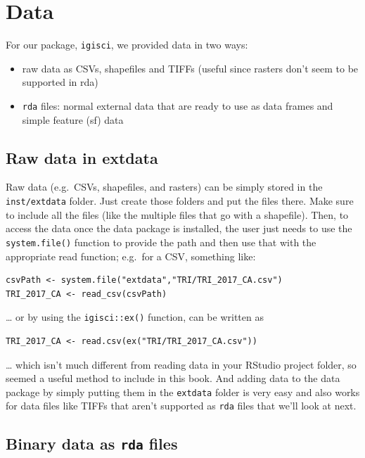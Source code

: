 \documentclass[
]{book}
\providecommand{\tightlist}{%
  \setlength{\itemsep}{0pt}\setlength{\parskip}{0pt}}
\begin{document}
\hypertarget{data-1}{%
\section{Data}\label{data-1}}

For our package, \texttt{igisci}, we provided data in two ways:

\begin{itemize}
\tightlist
\item
  raw data as CSVs, shapefiles and TIFFs (useful since rasters don't seem to be supported in rda)
\item
  \texttt{rda} files: normal external data that are ready to use as data frames and simple feature (sf) data
\end{itemize}

\hypertarget{raw-data-in-extdata}{%
\subsection{Raw data in extdata}\label{raw-data-in-extdata}}

Raw data (e.g.~CSVs, shapefiles, and rasters) can be simply stored in the \texttt{inst/extdata} folder. Just create those folders and put the files there. Make sure to include all the files (like the multiple files that go with a shapefile). Then, to access the data once the data package is installed, the user just needs to use the \texttt{system.file()} function to provide the path and then use that with the appropriate read function; e.g.~for a CSV, something like:

\begin{verbatim}
csvPath <- system.file("extdata","TRI/TRI_2017_CA.csv")
TRI_2017_CA <- read_csv(csvPath)
\end{verbatim}

\ldots{} or by using the \texttt{igisci::ex()} function, can be written as

\begin{verbatim}
TRI_2017_CA <- read.csv(ex("TRI/TRI_2017_CA.csv"))
\end{verbatim}

\ldots{} which isn't much different from reading data in your RStudio project folder, so seemed a useful method to include in this book. And adding data to the data package by simply putting them in the \texttt{extdata} folder is very easy and also works for data files like TIFFs that aren't supported as \texttt{rda} files that we'll look at next.

\hypertarget{binary-data-as-rda-files}{%
\subsection{\texorpdfstring{Binary data as \texttt{rda} files}{Binary data as rda files}}\label{binary-data-as-rda-files}}
\end{document}

